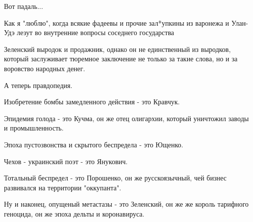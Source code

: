 \begin{itemize}
 
Вот падаль...

 
Как я "люблю", когда всякие фадеевы и прочие зал*упкины из варонежа и Улан-Удэ лезут во внутренние вопросы соседнего государства

 

Зеленский выродок и продажник, однако он не единственный из выродков, который
заслуживает тюремное заключение не только за такие слова, но и за воровство
народных денег.

А теперь правдопедия.

Изобретение бомбы замедленного действия - это Кравчук.

Эпидемия голода - это Кучма, он же отец олигархии, который уничтожил заводы и
промышленность.

Эпоха пустозвонства и скрытого беспредела - это Ющенко.

Чехов - украинский поэт - это Янукович.

Тотальный беспредел - это Порошенко, он же русскоязычный, чей бизнес развивался
на территории "оккупанта".

Ну и наконец, опущеный метастазы - это Зеленский, он же же король тарифного
геноцида, он же эпоха дельты и коронавируса.

\end{itemize}

